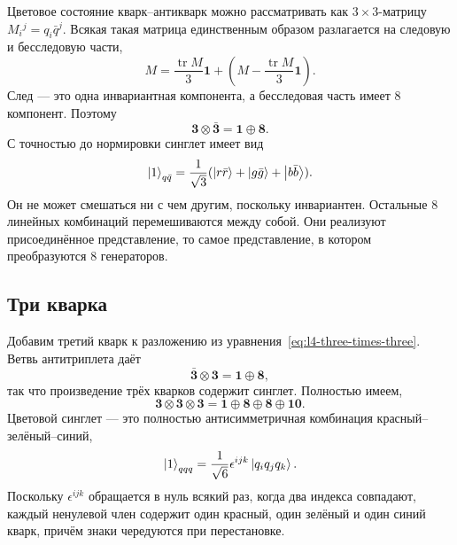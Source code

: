 Цветовое состояние кварк--антикварк можно рассматривать как \(3\times3\)-матрицу
\(M_i{}^j=q_i\bar q^j\). Всякая такая матрица единственным образом разлагается на следовую и
бесследовую части,
\begin{equation}
M=\frac{\operatorname{tr}M}{3}\boldsymbol 1
+\left(M-\frac{\operatorname{tr}M}{3}\boldsymbol 1\right).
\end{equation}
След — это одна инвариантная компонента, а бесследовая часть имеет 8
компонент. Поэтому
\begin{equation}
\boldsymbol 3\otimes\bar{\boldsymbol 3}
=\boldsymbol 1\oplus\boldsymbol 8.
\label{eq:l4-three-times-threebar}
\end{equation}
С точностью до нормировки синглет имеет вид
\begin{equation}
\left\lvert1\right\rangle_{q\bar q}
=\frac{1}{\sqrt3}
(\left\lvert r\bar r\right\rangle+\left\lvert g\bar g\right\rangle+\left\lvert b\bar b\right\rangle).
\end{equation}
Он не может смешаться ни с чем другим, поскольку инвариантен. Остальные 8
линейных комбинаций перемешиваются между собой. Они реализуют присоединённое
представление, то самое представление, в котором преобразуются 8
генераторов.

\subsection{Три кварка}

Добавим третий кварк к разложению из уравнения~\eqref{eq:l4-three-times-three}. Ветвь
антитриплета даёт
\begin{equation}
\bar{\boldsymbol 3}\otimes\boldsymbol 3
=\boldsymbol 1\oplus\boldsymbol 8,
\end{equation}
так что произведение трёх кварков содержит синглет. Полностью имеем,
\begin{equation}
\boldsymbol 3\otimes\boldsymbol 3\otimes\boldsymbol 3
=\boldsymbol 1\oplus\boldsymbol 8\oplus\boldsymbol 8
\oplus\boldsymbol{10}.
\label{eq:l4-three-quark-full}
\end{equation}
Цветовой синглет — это полностью антисимметричная комбинация красный--зелёный--синий,
\begin{equation}
\left\lvert1\right\rangle_{qqq}
=\frac{1}{\sqrt6}\epsilon^{ijk}\left\lvert q_iq_jq_k\right\rangle.
\label{eq:l4-baryon-singlet}
\end{equation}
Поскольку \(\epsilon^{ijk}\) обращается в нуль всякий раз, когда два индекса совпадают, каждый
ненулевой член содержит один красный, один зелёный и один синий кварк, причём знаки
чередуются при перестановке.

